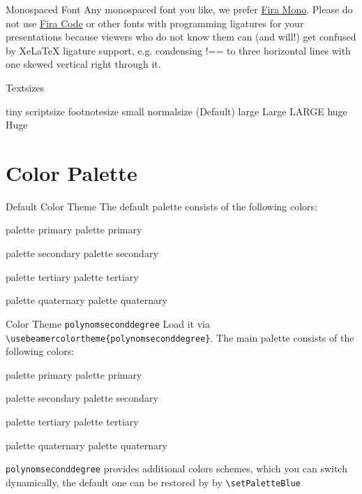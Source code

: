 \documentclass[fragile]{beamer}
\begin{document}
\begin{frame}{Monospaced Font}
  Any monospaced font you like, we prefer
  \href{https://mozilla.github.io/Fira/}{Fira Mono}. Please do not use
  \href{https://github.com/tonsky/FiraCode}{Fira Code} or other fonts with 
  programming ligatures for your presentations because viewers who do not 
  know them can (and will!) get confused by XeLaTeX ligature support, e.g.
  condensing !== to three horizontal lines with one skewed vertical right 
  through it.
\end{frame}
 
\begin{frame}{Textsizes}
  
  {\tiny tiny}
  {\scriptsize scriptsize}
  {\footnotesize footnotesize}
  {\small small}
  {\normalsize normalsize} (Default)
  {\large large}
  {\Large Large}
  {\LARGE LARGE}
  {\huge huge}
  {\Huge Huge}
\end{frame}

\section{Color Palette}

\newcommand{\clrbx}[1]{%
  \parbox{5em}{%
    \begin{beamercolorbox}[wd=5em,ht=5ex,dp=1.125ex,center]{#1}%
      \small#1%
    \end{beamercolorbox}%
  }%
}
\newcommand{\paletteColors}{%
  \begin{center}
    \clrbx{palette primary} %
    \clrbx{palette secondary}%
    \clrbx{palette tertiary}%
    \clrbx{palette quaternary}%
  \end{center}
}


\begin{frame}{Default Color Theme}
  The default palette consists of the following colors:\\
  \paletteColors
\end{frame}



\begin{frame}[fragile]{Color Theme \texttt{polynomseconddegree}}
  Load it via \verb|\usebeamercolortheme{polynomseconddegree}|. 
  The main palette consists of the following colors:\\
  \paletteColors
  
  \texttt{polynomseconddegree} provides additional colors schemes,
  which you can switch dynamically, the default one can be restored by by
  \verb|\setPaletteBlue|
\end{frame}
\end{document}
